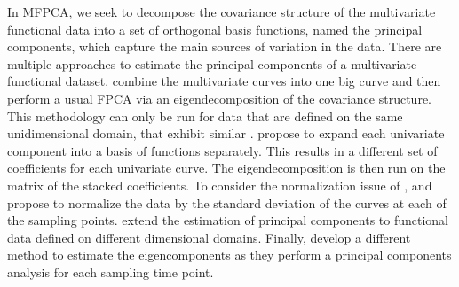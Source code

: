 In MFPCA, we seek to decompose the covariance structure of the multivariate functional data into a set of orthogonal basis functions, named the principal components, which capture the main sources of variation in the data. There are multiple approaches to estimate the principal components of a multivariate functional dataset. \cite{ramsayFunctionalDataAnalysis2005} combine the multivariate curves into one big curve and then perform a usual FPCA via an eigendecomposition of the covariance structure. This methodology can only be run for data that are defined on the same unidimensional domain, that exhibit similar . \cite{jacquesModelbasedClusteringMultivariate2014a} propose to expand each univariate component into a basis of functions separately. This results in a different set of coefficients for each univariate curve. The eigendecomposition is then run on the matrix of the stacked coefficients. To consider the normalization issue of \cite{ramsayFunctionalDataAnalysis2005}, \cite{jacquesModelbasedClusteringMultivariate2014a} and \cite{chiouMultivariateFunctionalPrincipal2014} propose to normalize the data by the standard deviation of the curves at each of the sampling points. \cite{happMultivariateFunctionalPrincipal2018a} extend the estimation of principal components to functional data defined on different dimensional domains.  Finally, \cite{berrenderoPrincipalComponentsMultivariate2011} develop a different method to estimate the eigencomponents as they perform a principal components analysis for each sampling time point.

